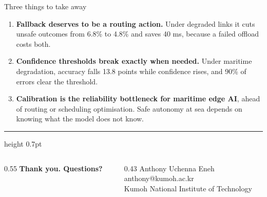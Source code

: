 \documentclass[aspectratio=169, 11pt]{beamer}
\begin{document}
\begin{frame}{Three things to take away}

\vspace{1.0em}
\begin{enumerate}\setlength\itemsep{1.1em}
  \item[\textbf{\color{cblue}1}] \textbf{Fallback deserves to be a routing action.} Under degraded links it cuts unsafe outcomes from 6.8\% to 4.8\% and saves 40 ms, because a failed offload costs both.
  \item[\textbf{\color{cblue}2}] \textbf{Confidence thresholds break exactly when needed.} Under maritime degradation, accuracy falls 13.8 points while confidence rises, and 90\% of errors clear the threshold.
  \item[\textbf{\color{cblue}3}] \textbf{Calibration is the reliability bottleneck for maritime edge AI}, ahead of routing or scheduling optimisation. Safe autonomy at sea depends on knowing what the model does not know.
\end{enumerate}

\vspace{1.4em}
{\color{rule}\hrule height 0.7pt}
\vspace{0.7em}
\begin{columns}[T]
\begin{column}{0.55\textwidth}
{\color{navy}\large\bfseries Thank you. Questions?}
\end{column}
\begin{column}{0.43\textwidth}
{\color{ink2}\footnotesize Anthony Uchenna Eneh\\ anthony@kumoh.ac.kr\\ Kumoh National Institute of Technology}
\end{column}
\end{columns}
\end{frame}

{
\begin{frame}[plain]
  \vfill{}\vfill
\end{frame}}
\end{document}
